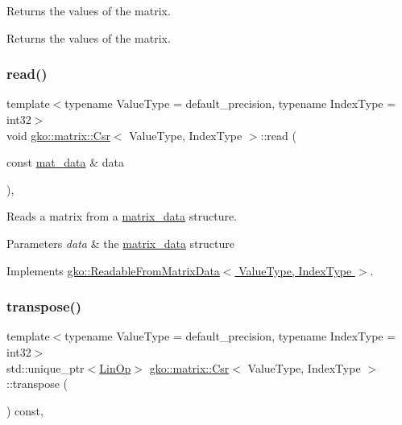 Returns the values of the matrix. 

\begin{DoxyReturn}{Returns}
the values of the matrix. 
\end{DoxyReturn}
\mbox{\label{classgko_1_1matrix_1_1Csr_ac4db41146ed3c3a8653b03d6b2c6c675}} 
\subsubsection{\texorpdfstring{read()}{read()}}
{\footnotesize\ttfamily template$<$typename Value\+Type = default\+\_\+precision, typename Index\+Type = int32$>$ \\
void \hyperlink{classgko_1_1matrix_1_1Csr}{gko\+::matrix\+::\+Csr}$<$ Value\+Type, Index\+Type $>$\+::read (\begin{DoxyParamCaption}\item[{const \hyperlink{structgko_1_1matrix__data}{mat\+\_\+data} \&}]{data }\end{DoxyParamCaption})\hspace{0.3cm}{\ttfamily [override]}, {\ttfamily [virtual]}}



Reads a matrix from a \hyperlink{structgko_1_1matrix__data}{matrix\+\_\+data} structure. 


\begin{DoxyParams}{Parameters}
{\em data} & the \hyperlink{structgko_1_1matrix__data}{matrix\+\_\+data} structure \\
\hline
\end{DoxyParams}


Implements \hyperlink{classgko_1_1ReadableFromMatrixData_add5c12e23b3ac3c8fbd607fa5a9656bb}{gko\+::\+Readable\+From\+Matrix\+Data$<$ Value\+Type, Index\+Type $>$}.

\mbox{\label{classgko_1_1matrix_1_1Csr_ab79e609214d6b4834d5961ee0a7d3519}} 
\subsubsection{\texorpdfstring{transpose()}{transpose()}}
{\footnotesize\ttfamily template$<$typename Value\+Type = default\+\_\+precision, typename Index\+Type = int32$>$ \\
std\+::unique\+\_\+ptr$<$\hyperlink{classgko_1_1LinOp}{Lin\+Op}$>$ \hyperlink{classgko_1_1matrix_1_1Csr}{gko\+::matrix\+::\+Csr}$<$ Value\+Type, Index\+Type $>$\+::transpose (\begin{DoxyParamCaption}{ }\end{DoxyParamCaption}) const\hspace{0.3cm}{\ttfamily [override]}, {\ttfamily [virtual]}}



